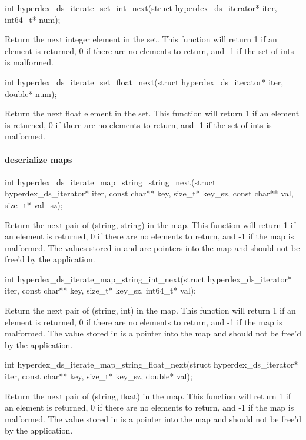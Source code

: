 \begin{ccode}
int hyperdex_ds_iterate_set_int_next(struct hyperdex_ds_iterator* iter, int64_t* num);
\end{ccode}
Return the next integer element in the set.  This function will return
1 if an element is returned, 0 if there are no elements to return, and -1 if the
set of ints is malformed.

\begin{ccode}
int hyperdex_ds_iterate_set_float_next(struct hyperdex_ds_iterator* iter, double* num);
\end{ccode}
Return the next float element in the set.  This function will return 1
if an element is returned, 0 if there are no elements to return, and -1 if the
set of ints is malformed.

\paragraph{deserialize maps}

\begin{ccode}
int hyperdex_ds_iterate_map_string_string_next(struct hyperdex_ds_iterator* iter,
                                               const char** key, size_t* key_sz,
                                               const char** val, size_t* val_sz);
\end{ccode}
Return the next pair of (string, string) in the map.  This function
will return 1 if an element is returned, 0 if there are no elements to return,
and -1 if the map is malformed.  The values stored in  and
 are pointers into the map and should not be free'd by the
application.

\begin{ccode}
int hyperdex_ds_iterate_map_string_int_next(struct hyperdex_ds_iterator* iter,
                                            const char** key, size_t* key_sz,
                                            int64_t* val);
\end{ccode}
Return the next pair of (string, int) in the map.  This function will
return 1 if an element is returned, 0 if there are no elements to return, and -1
if the map is malformed.  The value stored in  is a pointer into the
map and should not be free'd by the application.

\begin{ccode}
int hyperdex_ds_iterate_map_string_float_next(struct hyperdex_ds_iterator* iter,
                                              const char** key, size_t* key_sz,
                                              double* val);
\end{ccode}
Return the next pair of (string, float) in the map.  This function
will return 1 if an element is returned, 0 if there are no elements to return,
and -1 if the map is malformed.  The value stored in  is a pointer
into the map and should not be free'd by the application.

